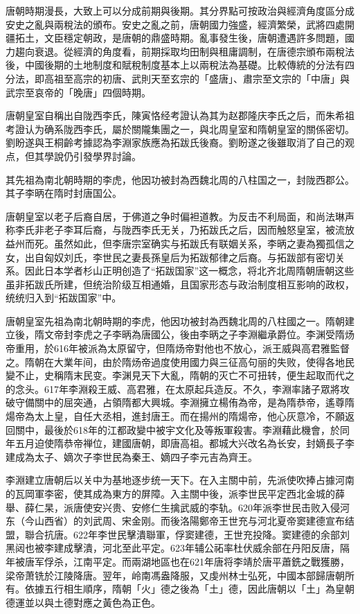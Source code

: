 唐朝時期漫長，大致上可以分成前期與後期。其分界點可按政治與經濟角度區分成安史之亂與兩稅法的頒布。安史之亂之前，唐朝國力強盛，經濟繁榮，武將四處開疆拓土，文臣穩定朝政，是唐朝的鼎盛時期。亂事發生後，唐朝遭遇許多問題，國力趨向衰退。從經濟的角度看，前期採取均田制與租庸調制，在唐德宗頒布兩稅法後，中國後期的土地制度和賦稅制度基本上以兩稅法為基礎。比較傳統的分法有四分法，即高祖至高宗的初唐、武則天至玄宗的「盛唐」、肅宗至文宗的「中唐」與武宗至哀帝的「晚唐」四個時期。

唐朝皇室自稱出自陇西李氏，陳寅恪经考證认為其为赵郡隆庆李氏之后，而朱希祖考證认为确系陇西李氏，屬於關隴集團之一，與北周皇室和隋朝皇室的關係密切。劉盼遂與王桐齡考據認為李淵家族應為拓跋氏後裔。劉盼遂之後雖取消了自己的观点，但其學說仍引發學界討論。

其先祖為南北朝時期的李虎，他因功被封為西魏北周的八柱国之一，封陇西郡公。其子李昞在隋时封唐国公。

唐朝皇室以老子后裔自居，于佛道之争时偏袒道教。为反击不利局面，和尚法琳声称李氏非老子李耳后裔，与陇西李氏无关，乃拓跋氏之后，因而触怒皇室，被流放益州而死。虽然如此，但李唐宗室确实与拓跋氏有联姻关系，李昞之妻為獨孤信之女，出自匈奴刘氏，李世民之妻長孫皇后为拓跋郁律之后裔。与拓跋部有密切关系。因此日本学者杉山正明创造了“拓跋国家”这一概念，将北齐北周隋朝唐朝这些虽非拓跋氏所建，但统治阶级互相通婚，且国家形态与政治制度相互影响的政权，统统归入到“拓跋国家”中。

唐朝皇室先祖為南北朝時期的李虎，他因功被封為西魏北周的八柱國之一。隋朝建立後，隋文帝封李虎之子李昞為唐國公，後由李昞之子李淵繼承爵位。李渊受隋炀帝重用，於616年被派為太原留守，但隋炀帝對他也不放心，派王威與高君雅監督之。隋朝在大業年间，由於隋炀帝過度使用國力與三征高句丽的失败，使得各地民變不止，史稱隋末民变。李渊見天下大亂，隋朝的灭亡不可扭转，便生起取而代之的念头。617年李淵殺王威、高君雅，在太原起兵造反。不久，李淵率諸子眾將攻破守備關中的屈突通，占領隋都大興城。李淵擁立楊侑為帝，是為隋恭帝，遙尊隋煬帝為太上皇，自任大丞相，進封唐王。而在揚州的隋煬帝，他心灰意冷，不願返回關中，最後於618年的江都政變中被宇文化及等叛軍殺害。李淵藉此機會，於同年五月迫使隋恭帝禅位，建國唐朝，即唐高祖。都城大兴改名為长安，封嫡長子李建成為太子、嫡次子李世民為秦王、嫡四子李元吉為齊王。

李淵建立唐朝后以关中为基地逐步统一天下。在入主關中前，先派使吹捧占據河南的瓦岡軍李密，使其成為東方的屏障。入主關中後，派李世民平定西北金城的薛舉、薛仁杲，派唐使安兴贵、安修仁生擒武威的李轨。620年派李世民击败入侵河东（今山西省）的刘武周、宋金刚。而後洛陽鄭帝王世充与河北夏帝窦建德宣布结盟，聯合抗唐。622年李世民擊潰聯軍，俘窦建德，王世充投降。窦建德的余部刘黑闼也被李建成擊潰，河北至此平定。623年辅公祏率杜伏威余部在丹阳反唐，隔年被唐军俘杀，江南平定。而兩湖地區也在621年唐将李靖於唐平蕭銑之戰獲勝，梁帝萧铣於江陵降唐。翌年，岭南馮盎降服，又虔州林士弘死，中國本部歸唐朝所有。依據五行相生順序，隋朝「火」德之後為「土」德，因此唐朝以「土」為皇朝德運並以與土德對應之黃色為正色。

